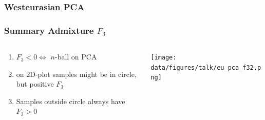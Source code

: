 \documentclass[11pt]{beamer}
\begin{document}
\begin{frame}
	\frametitle{Westeurasian PCA}
\end{frame}

\begin{frame}
\frametitle{Summary Admixture $F_3$}
\begin{columns}
	\begin{column}{.5\textwidth}
\begin{enumerate}[<+->]
	\item $F_3 < 0 \Leftrightarrow $ $n$-ball on PCA
	\item on 2D-plot samples might be in circle, but positive $F_3$
	\item Samples outside circle always have $F_3 > 0$ 
	
\end{enumerate}
	\end{column}
	\begin{column}{.7\textwidth}
\texttt{[image: data/figures/talk/eu\_pca\_f32.png]}
\end{column}
\end{columns}

\end{frame}

\end{document}
